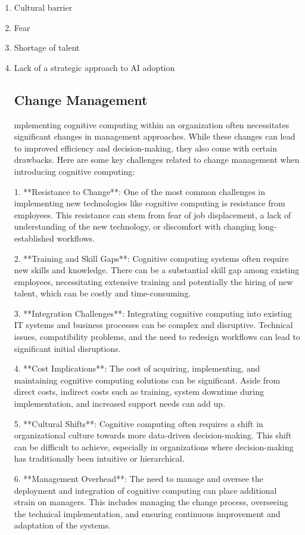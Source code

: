 \documentclass{article}
\begin{document}
\begin{enumerate}
	\item Cultural barrier 
	\item Fear
	\item Shortage of talent
	\item Lack of a strategic approach to AI adoption
\subsection{Change Management}
mplementing cognitive computing within an organization often necessitates significant changes in management approaches. While these changes can lead to improved efficiency and decision-making, they also come with certain drawbacks. Here are some key challenges related to change management when introducing cognitive computing:

1. **Resistance to Change**: One of the most common challenges in implementing new technologies like cognitive computing is resistance from employees. This resistance can stem from fear of job displacement, a lack of understanding of the new technology, or discomfort with changing long-established workflows.

2. **Training and Skill Gaps**: Cognitive computing systems often require new skills and knowledge. There can be a substantial skill gap among existing employees, necessitating extensive training and potentially the hiring of new talent, which can be costly and time-consuming.

3. **Integration Challenges**: Integrating cognitive computing into existing IT systems and business processes can be complex and disruptive. Technical issues, compatibility problems, and the need to redesign workflows can lead to significant initial disruptions.

4. **Cost Implications**: The cost of acquiring, implementing, and maintaining cognitive computing solutions can be significant. Aside from direct costs, indirect costs such as training, system downtime during implementation, and increased support needs can add up.

5. **Cultural Shifts**: Cognitive computing often requires a shift in organizational culture towards more data-driven decision-making. This shift can be difficult to achieve, especially in organizations where decision-making has traditionally been intuitive or hierarchical.

6. **Management Overhead**: The need to manage and oversee the deployment and integration of cognitive computing can place additional strain on managers. This includes managing the change process, overseeing the technical implementation, and ensuring continuous improvement and adaptation of the systems.


\end{enumerate}
\end{document}
